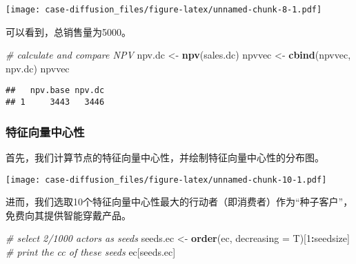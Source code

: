 \documentclass[]{article}
\newenvironment{Shaded}{\begin{snugshade}}{\end{snugshade}}
\newcommand{\CommentTok}[1]{\textcolor[rgb]{0.56,0.35,0.01}{\textit{#1}}}
\newcommand{\DataTypeTok}[1]{\textcolor[rgb]{0.13,0.29,0.53}{#1}}
\newcommand{\DecValTok}[1]{\textcolor[rgb]{0.00,0.00,0.81}{#1}}
\newcommand{\FloatTok}[1]{\textcolor[rgb]{0.00,0.00,0.81}{#1}}
\newcommand{\KeywordTok}[1]{\textcolor[rgb]{0.13,0.29,0.53}{\textbf{#1}}}
\newcommand{\NormalTok}[1]{#1}
\newcommand{\OperatorTok}[1]{\textcolor[rgb]{0.81,0.36,0.00}{\textbf{#1}}}
\newcommand{\StringTok}[1]{\textcolor[rgb]{0.31,0.60,0.02}{#1}}
\begin{document}
\texttt{[image: case-diffusion\_files/figure-latex/unnamed-chunk-8-1.pdf]}

可以看到，总销售量为5000。

\begin{Shaded}
\begin{Highlighting}[]
\CommentTok{# calculate and compare NPV}
\NormalTok{npv.dc <-}\StringTok{ }\KeywordTok{npv}\NormalTok{(sales.dc)}
\NormalTok{npvvec <-}\StringTok{ }\KeywordTok{cbind}\NormalTok{(npvvec, npv.dc)}
\NormalTok{npvvec}
\end{Highlighting}
\end{Shaded}

\begin{verbatim}
##   npv.base npv.dc
## 1     3443   3446
\end{verbatim}

\subsubsection{特征向量中心性}

首先，我们计算节点的特征向量中心性，并绘制特征向量中心性的分布图。

\begin{Shaded}
\end{Shaded}

\texttt{[image: case-diffusion\_files/figure-latex/unnamed-chunk-10-1.pdf]}

进而，我们选取10个特征向量中心性最大的行动者（即消费者）作为``种子客户''，免费向其提供智能穿戴产品。

\begin{Shaded}
\begin{Highlighting}[]
\CommentTok{# select 2/1000 actors as seeds}
\NormalTok{seeds.ec <-}\StringTok{ }\KeywordTok{order}\NormalTok{(ec, }\DataTypeTok{decreasing =}\NormalTok{ T)[}\DecValTok{1}\OperatorTok{:}\NormalTok{seedsize]}
\CommentTok{# print the cc of these seeds}
\NormalTok{ec[seeds.ec]}
\end{Highlighting}
\end{Shaded}
\end{document}
